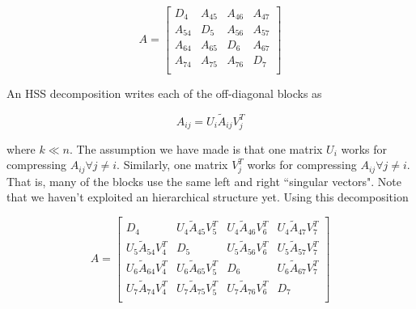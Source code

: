 \begin{equation*}
    A = \begin{bmatrix}
        D_4    & A_{45} & A_{46} & A_{47} \\
        A_{54} & D_5    & A_{56} & A_{57} \\
        A_{64} & A_{65} & D_6    & A_{67} \\
        A_{74} & A_{75} & A_{76} & D_7    \\
\end{bmatrix}
\end{equation*}

An HSS decomposition writes each of the off-diagonal blocks as

\begin{equation*}
    A_{ij} = U_i \widetilde{A}_{ij} V^T_j
\end{equation*}

where $k \ll n$. The assumption we have made is that one matrix $U_i$ works for compressing $A_{ij}\forall j\neq i$. Similarly, one matrix $V_j^T$ works for compressing $A_{ij}\forall j\neq i$. That is, many of the blocks use the same left and right ``singular vectors". Note that we haven't exploited an hierarchical structure yet. Using this decomposition

\begin{equation*}
    A =
    \begin{bmatrix}
        D_4    & U_4\widetilde{A}_{45}V^T_5 & U_4\widetilde{A}_{46}V^T_6 & U_4\widetilde{A}_{47}V^T_7 \\
        U_5\widetilde{A}_{54}V^T_4 & D_5    & U_5\widetilde{A}_{56}V^T_6 & U_5\widetilde{A}_{57}V^T_7 \\
        U_6\widetilde{A}_{64}V^T_4 & U_6\widetilde{A}_{65}V^T_5 & D_6 & U_6\widetilde{A}_{67}V^T_7 \\
        U_7\widetilde{A}_{74}V^T_4 & U_7\widetilde{A}_{75}V^T_5 & U_7\widetilde{A}_{76}V^T_6 & D_7    \\
    \end{bmatrix}
\end{equation*}


